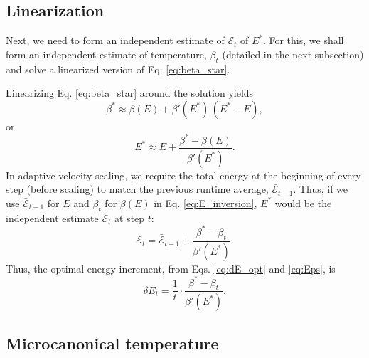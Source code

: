 \documentclass[preprint]{revtex4-1}
\begin{document}
\subsection{Linearization}



Next, we need to form an independent estimate of
$\mathcal E_t$ of $E^*$.
%
For this, we shall form
an independent estimate of temperature, $\beta_t$
(detailed in the next subsection)
and solve a linearized version of Eq. \eqref{eq:beta_star}.

Linearizing Eq. \eqref{eq:beta_star} around the solution
yields
%
\begin{equation*}
\beta^*
\approx
\beta( E )
+
\beta'( E^* ) \, ( E^* - E )
,
\end{equation*}
%
or
%
\begin{equation}
E^*
\approx
E
+
\frac{ \beta^* - \beta(E) }
     { \beta'(E^*) }
.
\label{eq:E_inversion}
\end{equation}
%
In adaptive velocity scaling,
we require the total energy at the beginning of every step
(before scaling) to match the previous runtime average,
$\bar{\mathcal E}_{t - 1}$.
%
Thus, if we use $\bar{\mathcal E}_{t - 1}$ for $E$
and $\beta_t$ for $\beta(E)$
in Eq. \eqref{eq:E_inversion},
$E^*$ would be the independent estimate
$\mathcal E_{t}$ at step $t$:
%
%
\begin{equation}
\mathcal E_t
=
\bar{\mathcal E}_{t - 1}
+
\frac{ \beta^* - \beta_t }
     { \beta'(E^*) }
.
\label{eq:Eps}
\end{equation}
%
Thus, the optimal energy increment,
from Eqs. \eqref{eq:dE_opt} and \eqref{eq:Eps},
is
%
\begin{equation}
\delta E_t
=
\frac{ 1 } { t }
\cdot
\frac{ \beta^* - \beta_t }
     { \beta'(E^*) }
.
\label{eq:dE_beta}
\end{equation}
%



\subsection{Microcanonical temperature}
\end{document}
